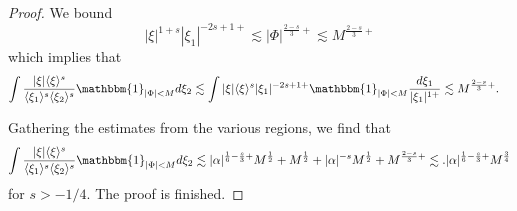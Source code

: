 \documentclass[%
11pt,  reqno]{amsart}
\newcommand{\fia}{\mathbbm{1}_{|\Phi-\alpha|<M}}
\newcommand{\jap}[1]{\langle #1 \rangle}
\newcommand{\5}{\textup{V}}
\newcommand{\noi}{\noindent}
\newcommand{\les}{\lesssim}
\theoremstyle{remark}
\newcommand{\bul}{\bullet}
\newcommand{\ges}{\gtrsim}
\numberwithin{equation}{section}
\numberwithin{theorem}{section}
\begin{document}
\begin{proof}
We bound
\begin{equation}\label{eq:estbm1}
    |\xi|^{1+s}|\xi_1|^{-2s+1+}\lesssim |\Phi|^{\frac{2-s}{3}+}\lesssim M^{\frac{2-s}{3}+}
\end{equation}
which implies that
\begin{align}
\int \frac{|\xi|\jap{\xi}^s}{\jap{\xi_1}^s\jap{\xi_2}^s}\mathbbm{1}_{|\Phi|<M} d\xi_2 &\les \int |\xi|\jap{\xi}^s|\xi_1|^{-2s+1+}\mathbbm{1}_{|\Phi|<M}\frac{d\xi_1}{|\xi_1|^{1+}}\lesssim  M^{\frac{2-s}{3}+}.
\end{align}

\medskip

Gathering the estimates from the various regions, we find that
\begin{align}
\int \frac{|\xi|\jap{\xi}^s}{\jap{\xi_1}^s\jap{\xi_2}^s}\mathbbm{1}_{|\Phi|<M} d\xi_2 \lesssim |\alpha|^{\frac16-\frac s3+}M^{\frac12} + M^{\frac12} + |\alpha|^{-s}M^{\frac12} +  M^{\frac{2-s}{3}+} \lesssim .|\alpha|^{\frac16-\frac s3+}M^{\frac34}
\end{align}
for $s>-1/4$. The proof is finished.\qedhere








\end{proof}
\end{document}
